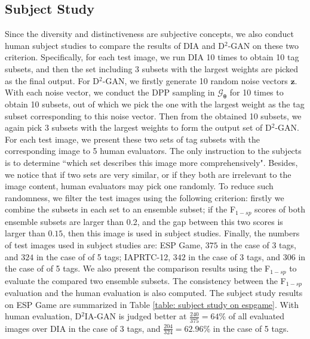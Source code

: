 \documentclass[10pt,twocolumn,letterpaper]{article}
\newcommand{\z}{\mathbf{z}}
\newcommand{\G}{\mathcal{G}}
\begin{document}
\vspace{-0.1in}
\subsection{Subject Study}
\label{sec: subsec subjet study}
\vspace{-0.05in}

Since the diversity and distinctiveness are subjective concepts,  
we also conduct human subject studies to compare the results of DIA and D$^2$-GAN on these two criterion. 
Specifically, for each test image, we run DIA 10 times to obtain 10 tag subsets, and then the set including 3 subsets with the largest weights are picked as the final output. 
For D$^2$-GAN, we firstly generate 10 random noise vectors $\z$. With each noise vector, we conduct the DPP sampling in $\G_{\boldsymbol{\theta}}$ for 10 times to obtain 10 subsets, out of which we pick the one with the largest weight as the tag subset corresponding to this noise vector. Then from the obtained 10 subsets, we again pick 3 subsets with the largest weights to form the output set of D$^2$-GAN. 
For each test image, we present these two sets of tag subsets with the corresponding image to 5 human evaluators. The only instruction to the subjects is to determine ``which set  describes this image more comprehensively". 
Besides, we notice that if two sets are very similar, or if they both are irrelevant to the image content, human evaluators may pick one randomly. To reduce such randomness, we filter the test images using the following criterion: firstly we combine the subsets in each set to an ensemble subset; if the F$_{1-sp}$ scores of both ensemble subsets are larger than 0.2, and the gap between this two scores is larger than $0.15$, then this image is used in subject studies. 
Finally, the numbers of test images used in subject studies are: ESP Game, $375$ in the case of 3 tags, and $324$ in the case of of 5 tags; IAPRTC-12, $342$ in the case of 3 tags, and $306$ in the case of of 5 tags. 
%
We also present the comparison results using the F$_{1-sp}$ to evaluate the compared two ensemble subsets. The consistency between the F$_{1-sp}$ evaluation and the human evaluation is also computed. 
%
The subject study results on ESP Game are summarized in Table \ref{table: subject study on espgame}. With human evaluation, D$^2$IA-GAN is judged better at $\frac{240}{375}=64\%$ of all evaluated images over DIA in the case of 3 tags, and $\frac{204}{324}=62.96\%$ in the case of 5 tags. 
\end{document}
